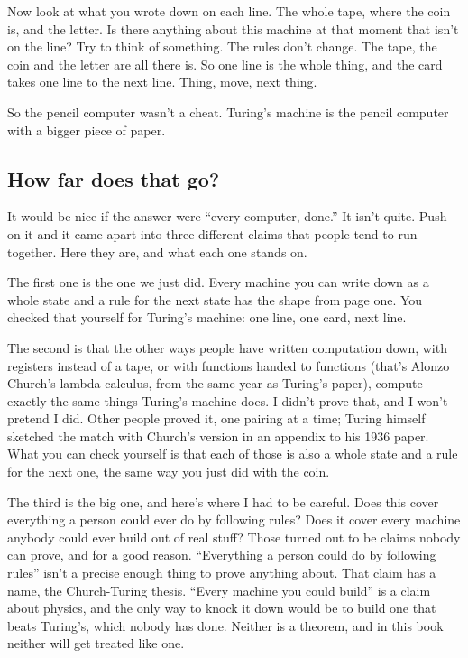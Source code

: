 \documentclass[11pt,twoside]{article}
\theoremstyle{thielethm}
\theoremstyle{thieledef}
\theoremstyle{thieledef}
\theoremstyle{thieledef}
\theoremstyle{thielethm}
\theoremstyle{thieleobs}
\theoremstyle{thielethm}
\begin{document}
Now look at what you wrote down on each line. The whole tape, where the coin is, and the letter. Is there anything about this machine at that moment that isn't on the line? Try to think of something. The rules don't change. The tape, the coin and the letter are all there is. So one line is the whole thing, and the card takes one line to the next line. Thing, move, next thing.

So the pencil computer wasn't a cheat. Turing's machine is the pencil computer with a bigger piece of paper.

\subsection{How far does that go?}

It would be nice if the answer were ``every computer, done.'' It isn't quite. Push on it and it came apart into three different claims that people tend to run together. Here they are, and what each one stands on.

The first one is the one we just did. Every machine you can write down as a whole state and a rule for the next state has the shape from page one. You checked that yourself for Turing's machine: one line, one card, next line.

The second is that the other ways people have written computation down, with registers instead of a tape, or with functions handed to functions (that's Alonzo Church's lambda calculus, from the same year as Turing's paper), compute exactly the same things Turing's machine does. I didn't prove that, and I won't pretend I did. Other people proved it, one pairing at a time; Turing himself sketched the match with Church's version in an appendix to his 1936 paper. What you can check yourself is that each of those is also a whole state and a rule for the next one, the same way you just did with the coin.

The third is the big one, and here's where I had to be careful. Does this cover everything a person could ever do by following rules? Does it cover every machine anybody could ever build out of real stuff? Those turned out to be claims nobody can prove, and for a good reason. ``Everything a person could do by following rules'' isn't a precise enough thing to prove anything about. That claim has a name, the Church-Turing thesis. ``Every machine you could build'' is a claim about physics, and the only way to knock it down would be to build one that beats Turing's, which nobody has done. Neither is a theorem, and in this book neither will get treated like one.
\end{document}

